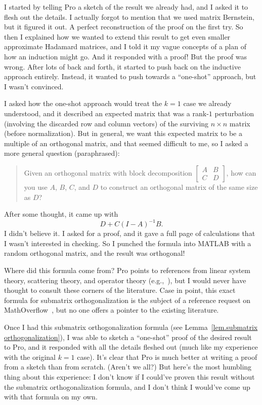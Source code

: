 \documentclass[11pt]{article}
\theoremstyle{plain}
\theoremstyle{definition}
\begin{document}
I started by telling Pro a sketch of the result we already had, and I asked it to flesh out the details. 
I actually forgot to mention that we used matrix Bernstein, but it figured it out. 
A perfect reconstruction of the proof on the first try. 
So then I explained how we wanted to extend this result to get even smaller approximate Hadamard matrices, and I told it my vague concepts of a plan of how an induction might go. 
And it responded with a proof! 
But the proof was wrong. 
After lots of back and forth, it started to push back on the inductive approach entirely.
Instead, it wanted to push towards a ``one-shot'' approach, but I wasn't convinced. 

I asked how the one-shot approach would treat the $k=1$ case we already understood, and it described an expected matrix that was a rank-$1$ perturbation (involving the discarded row and column vectors) of the surviving $n\times n$ matrix (before normalization). 
But in general, we want this expected matrix to be a multiple of an orthogonal matrix, and that seemed difficult to me, so I asked a more general question (paraphrased):
\begin{quote}
Given an orthogonal matrix with block decomposition $\left[\begin{smallmatrix} A & B \\ C & D \end{smallmatrix}\right]$, how can you use $A$, $B$, $C$, and $D$ to construct an orthogonal matrix of the same size as $D$? 
\end{quote}
After some thought, it came up with 
\[
D+C(I-A)^{-1}B.
\]
I didn't believe it. 
I asked for a proof, and it gave a full page of calculations that I wasn't interested in checking. 
So I punched the formula into MATLAB with a random orthogonal matrix, and the result was orthogonal!

Where did this formula come from? 
Pro points to references from linear system theory, scattering theory, and operator theory (e.g.,~\cite{Alpay:02}), but I would never have thought to consult these corners of the literature.
Case in point, this exact formula for submatrix orthogonalization is the subject of a reference request on MathOverflow~\cite{Terrell:mo}, but no one offers a pointer to the existing literature.

Once I had this submatrix orthogonalization formula (see Lemma~\ref{lem.submatrix orthogonalization}), I was able to sketch a ``one-shot'' proof of the desired result to Pro, and it responded with all the details fleshed out (much like my experience with the original $k=1$ case). 
It's clear that Pro is much better at writing a proof from a sketch than from scratch. 
(Aren't we all?) 
But here's the most humbling thing about this experience: 
I don't know if I could've proven this result without the submatrix orthogonalization formula, and I don't think I would've come up with that formula on my own.
\end{document}
